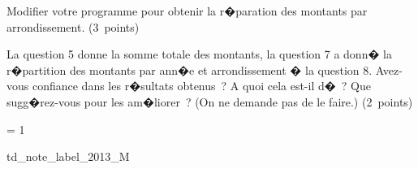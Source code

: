 \begin{xexercice}
Modifier votre programme pour obtenir la r�paration des montants par arrondissement. (3~points)

\exequest La question 5 donne la somme totale des montants, la question 7 a donn� la r�partition des montants par ann�e et arrondissement � la question 8. Avez-vous confiance dans les r�sultats obtenus~? A quoi cela est-il d�~? Que sugg�rez-vous pour les am�liorer~? (On ne demande pas de le faire.) (2~points)


\end{xexercice}




\ifnum\correctionenonce = 1

\begin{xdemoexonot}{td_note_label_2013_M}




\end{xdemoexonot}
\fi
\fi

%
